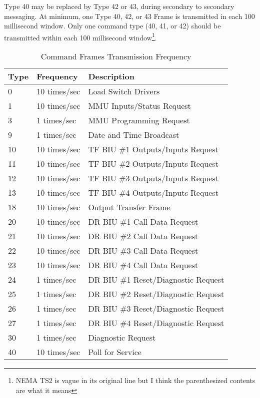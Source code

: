 \documentclass[]{article}
\begin{document}
Type 40 may be replaced by Type 42 or 43, during secondary to secondary messaging. At minimum, one Type 40, 42, or 43 Frame is transmitted in each 100 millisecond window. Only one command type (40, 41, or 42) should be transmitted within each 100 millisecond window\footnote{NEMA TS2 is vague in its original line but I think the parenthesized contents are what it means}. 

\begin{table}[]
	\footnotesize
	\centering
	\begin{tabular}{@{}lll@{}}
		\toprule
		\textbf{Type} & \textbf{Frequency} & \textbf{Description}                \\ \midrule
		0             & 10 times/sec       & Load Switch Drivers                 \\
		1             & 10 times/sec       & MMU Inputs/Status Request           \\
		3             & 1 times/sec        & MMU Programming Request             \\
		9             & 1 times/sec        & Date and Time Broadcast             \\
		10            & 10 times/sec       & TF BIU \#1 Outputs/Inputs Request   \\
		11            & 10 times/sec       & TF BIU \#2 Outputs/Inputs Request   \\
		12            & 10 times/sec       & TF BIU \#3 Outputs/Inputs Request   \\
		13            & 10 times/sec       & TF BIU \#4 Outputs/Inputs Request   \\
		18            & 10 times/sec       & Output Transfer Frame               \\
		20            & 10 times/sec       & DR BIU \#1 Call Data Request        \\
		21            & 10 times/sec       & DR BIU \#2 Call Data Request        \\
		22            & 10 times/sec       & DR BIU \#3 Call Data Request        \\
		23            & 10 times/sec       & DR BIU \#4 Call Data Request        \\
		24            & 1 times/sec        & DR BIU \#1 Reset/Diagnostic Request \\
		25            & 1 times/sec        & DR BIU \#2 Reset/Diagnostic Request \\
		26            & 1 times/sec        & DR BIU \#3 Reset/Diagnostic Request \\
		27            & 1 times/sec        & DR BIU \#4 Reset/Diagnostic Request \\
		30            & 1 times/sec        & Diagnostic Request                  \\
		40            & 10 times/sec       & Poll for Service                    \\ \bottomrule
	\end{tabular}
	\caption{Command Frames Transmission Frequency}
	\label{tab:cmd-frames-freq}
\end{table}
\end{document}
